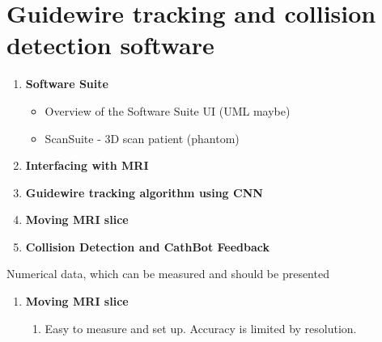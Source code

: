 \chapter{Guidewire tracking and collision detection software}
\label{ch:simulation-and-detection}

\begin{enumerate}
    \item \textbf{Software Suite}
    \begin{itemize} 
        \item Overview of the Software Suite UI (UML maybe)
        \item ScanSuite - 3D scan patient (phantom)
    \end{itemize}
    \item \textbf{Interfacing with MRI}
    \item \textbf{Guidewire tracking algorithm using CNN}
    \item \textbf{Moving MRI slice}
    \item \textbf{Collision Detection and CathBot Feedback}
\end{enumerate}

Numerical data, which can be measured and should be presented
\begin{enumerate}
    \item \textbf{Moving MRI slice}
    \begin{enumerate}
        \item Easy to measure and set up. Accuracy is limited by resolution.
    \end{enumerate}
\end{enumerate}
